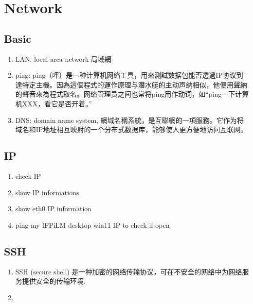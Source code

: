 \chapter{Network}
\section{Basic}
\begin{enumerate}
\item LAN: local area network 局域網
\item ping: ping（呯）是一种计算机网络工具，用來測試数据包能否透過IP协议到達特定主機。因為這個程式的運作原理与潛水艇的主动声纳相似，他便用聲納的聲音來為程式取名。网络管理员之间也常将ping用作动词，如“ping一下计算机XXX，看它是否开着。”
\item DNS: domain name system, 網域名稱系統，是互聯網的一項服務。它作为将域名和IP地址相互映射的一个分布式数据库，能够使人更方便地访问互联网。
\end{enumerate}

\section{IP}
\begin{enumerate}
\item {} check IP
\item {} show IP informations
\item {} show eth0 IP information
\item {} ping my IFPiLM desktop win11 IP to check if open
\end{enumerate}

\section{SSH}
\begin{enumerate}
\item SSH (secure shell) 是一种加密的网络传输协议，可在不安全的网络中为网络服务提供安全的传输环境.
\item{}
\end{enumerate}

